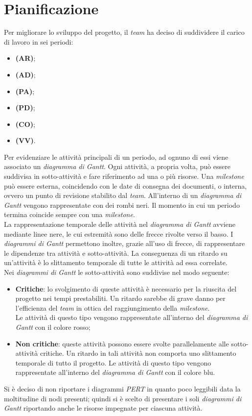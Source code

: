 \newpage
\section{Pianificazione}
Per migliorare lo sviluppo del progetto, il \textit{team} ha deciso di suddividere il carico di lavoro in sei periodi:
\begin{itemize}
	\item \textbf{\AR (AR)};
	\item \textbf{\AD (AD)};
	\item \textbf{\PA (PA)};
	\item \textbf{\PD (PD)};
	\item \textbf{\CO (CO)};
	\item \textbf{\VV (VV)}.
\end{itemize}

Per evidenziare le attività principali di un periodo, ad ognuno di essi viene associato un \textit{diagramma di Gantt}.
Ogni attività, a propria volta, può essere suddivisa in sotto-attività e fare riferimento ad una o più risorse.
Una \textit{milestone} può essere esterna, coincidendo con le date di consegna dei documenti, o interna, ovvero un punto di revisione stabilito dal \textit{team}.
All'interno di un \textit{diagramma di Gantt} vengono rappresentate con dei rombi neri.
Il momento in cui un periodo termina coincide sempre con una \textit{milestone}.\\
La rappresentazione temporale delle attività nel \textit{diagramma di Gantt} avviene mediante linee nere, le cui estremità sono delle frecce rivolte verso il basso.
I \textit{diagrammi di Gantt} permettono inoltre, grazie all'uso di frecce, di rappresentare le dipendenze tra attività e sotto-attività.
La conseguenza di un ritardo su un'attività è lo slittamento temporale di tutte le attività ad essa correlate. \\

Nei \textit{diagrammi di Gantt} le sotto-attività sono suddivise nel modo seguente:
\begin{itemize}
	\item \textbf{Critiche}: lo svolgimento di queste attività è necessario per la riuscita del progetto nei tempi prestabiliti. Un ritardo sarebbe di grave danno per l'efficienza del \textit{team} in ottica del raggiungimento della \textit{milestone}. \\
	Le attività di questo tipo vengono rappresentate all'interno del \textit{diagramma di Gantt} con il colore rosso;
	\item \textbf{Non critiche}: queste attività possono essere svolte parallelamente alle sotto-attività critiche. Un ritardo in tali attività non comporta uno slittamento temporale di tutto il progetto.
	Le attività di questo tipo vengono rappresentate all'interno del \textit{diagramma di Gantt} con il colore blu.
\end{itemize}
Si è deciso di non riportare i diagrammi \textit{PERT} in quanto poco leggibili data la moltitudine di nodi presenti; quindi si è scelto di presentare i soli \textit{diagrammi di Gantt} riportando anche le risorse impegnate per ciascuna attività.

